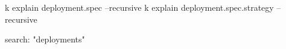 

\begin{cheatcodebash}
k explain deployment.spec --recursive
k explain deployment.spec.strategy --recursive
\end{cheatcodebash}

\begin{cheatcodebash}
search: "deployments"
\end{cheatcodebash}
